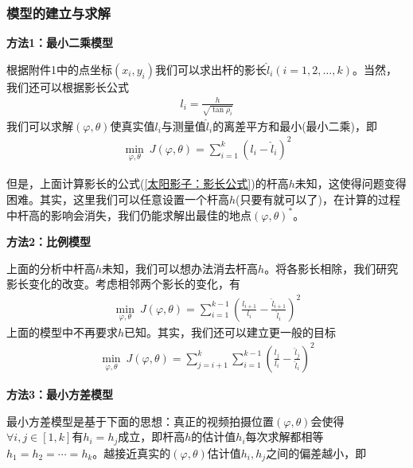         \subsubsection{模型的建立与求解}
            \par
            \textbf{方法1：最小二乘模型}
            \par
            根据附件1中的点坐标$(x_i,y_i)$我们可以求出杆的影长$\hat{l}_i(i=1,2,\dots,k)$。当然，我们还可以根据影长公式
            \begin{align}
            \label{太阳影子：影长公式}
            l_i = \frac{h}{\sqrt{\tan \rho_i}}
            \end{align}
            我们可以求解$(\varphi,\theta)$使真实值$l_i$与测量值$\hat{l}_i$的离差平方和最小(最小二乘)，即
            \begin{align*}
            \min_{\varphi,\theta}\  J(\varphi,\theta) = \sum_{i=1}^k (l_i-\hat{l}_i)^2
            \end{align*}
            \par
            但是，上面计算影长的公式(\ref{太阳影子：影长公式})的杆高$h$未知，这使得问题变得困难。其实，这里我们可以任意设置一个杆高$h$(只要有就可以了)，在计算的过程中杆高的影响会消失，我们仍能求解出最佳的地点$(\varphi,\theta)^*$。
            \par
            \textbf{方法2：比例模型}
            \par
            上面的分析中杆高$h$未知，我们可以想办法消去杆高$h$。将各影长相除，我们研究影长变化的改变。考虑相邻两个影长的变化，有
            \begin{align*}
            \min_{\varphi,\theta}\ J(\varphi,\theta) = \sum_{i=1}^{k-1} \left( \frac{l_{i+1}}{l_i} - \frac{\hat{l}_{i+1}}{\hat{l}_i} \right) ^2
            \end{align*}
            上面的模型中不再要求$h$已知。其实，我们还可以建立更一般的目标
            \begin{align*}
            \min_{\varphi,\theta}\ J(\varphi,\theta) = \sum_{j=i+1}^k\sum_{i=1}^{k-1} \left( \frac{l_{j}}{l_i} - \frac{\hat{l}_{j}}{\hat{l}_i} \right) ^2
            \end{align*}
            \par
            \textbf{方法3：最小方差模型}
            \par
            最小方差模型是基于下面的思想：真正的视频拍摄位置$(\varphi,\theta)$会使得$\forall i,j\in [1,k]$有$h_i=h_j$成立，即杆高$h$的估计值$h_i$每次求解都相等$h_1=h_2=\cdots=h_k$。越接近真实的$(\varphi,\theta)$估计值$h_i,h_j$之间的偏差越小，即
